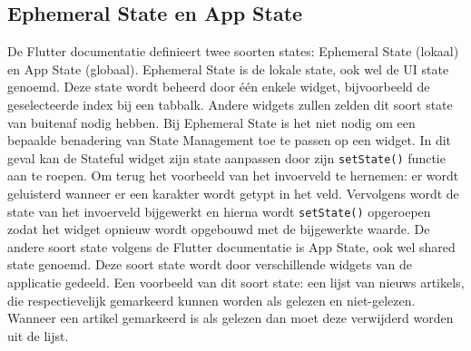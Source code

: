 \subsection{Ephemeral State en App State}
De Flutter documentatie definieert twee soorten states: Ephemeral State (lokaal) en App State (globaal).
Ephemeral State is de lokale state, ook wel de UI state genoemd. Deze state wordt beheerd door één enkele widget, bijvoorbeeld de geselecteerde index bij een tabbalk. Andere widgets zullen zelden dit soort state van buitenaf nodig hebben. Bij Ephemeral State is het niet nodig om een bepaalde benadering van State Management toe te passen op een widget. In dit geval kan de Stateful widget zijn state aanpassen door zijn \verb|setState()| functie aan te roepen.
Om terug het voorbeeld van het invoerveld te hernemen: er wordt geluisterd wanneer er een karakter wordt getypt in het veld. Vervolgens wordt de state van het invoerveld bijgewerkt en hierna wordt \verb|setState()| opgeroepen zodat het widget opnieuw wordt opgebouwd met de bijgewerkte waarde.
\newline \newline
De andere soort state volgens de Flutter documentatie \autocite{Developers2019} is App State, ook wel shared state genoemd. Deze soort state wordt door verschillende widgets van de applicatie gedeeld.
Een voorbeeld van dit soort state: een lijst van nieuws artikels, die respectievelijk gemarkeerd kunnen worden als gelezen en niet-gelezen. Wanneer een artikel gemarkeerd is als gelezen dan moet deze verwijderd worden uit de lijst. 
\newline

